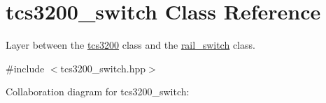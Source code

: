\hypertarget{classtcs3200__switch}{}\section{tcs3200\+\_\+switch Class Reference}
\label{classtcs3200__switch}


Layer between the \hyperlink{classtcs3200}{tcs3200} class and the \hyperlink{classrail__switch}{rail\+\_\+switch} class.  




{\ttfamily \#include $<$tcs3200\+\_\+switch.\+hpp$>$}



Collaboration diagram for tcs3200\+\_\+switch\+:
